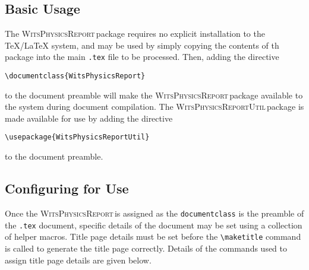 \documentclass[10pt, a4paper, oneside]{article}
\newcommand{\WitsPhysicsReport}{\textrm{\textsc{WitsPhysicsReport}}\,}
\newcommand{\WitsPhysicsReportUtil}{\textrm{\textsc{WitsPhysicsReportUtil}}\,}
\begin{document}
\subsection{Basic Usage}
\label{sec:Basic Usage}

\par{The \WitsPhysicsReport package requires no explicit installation to the \TeX/\LaTeX{} system, and may be used by simply copying the contents of th package into the  main \lstinline{.tex} file to be processed. Then, adding the directive
\begin{lstlisting}
\documentclass{WitsPhysicsReport}
\end{lstlisting}
to the document preamble will make the \WitsPhysicsReport package available to the system during document compilation.  The \WitsPhysicsReportUtil package is made available for use by adding the directive
\begin{lstlisting}
\usepackage{WitsPhysicsReportUtil}
\end{lstlisting}
to the document preamble. }

\subsection{Configuring for Use}
\label{sec:Configuring_for_Use}

\par{Once the \WitsPhysicsReport is assigned as the \lstinline{documentclass} is the preamble of the \lstinline{.tex} document, specific details of the document may be set using a collection of helper macros. Title page details must be set before the \lstinline{\maketitle} command is called to generate the title page correctly. Details of the commands used to assign title page details are given below.}
\end{document}
